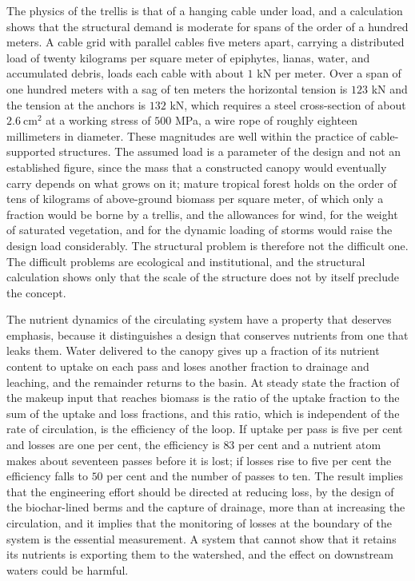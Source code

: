 The physics of the trellis is that of a hanging cable under load, and a calculation shows that the structural demand is moderate for spans of the order of a hundred meters. A cable grid with parallel cables five meters apart, carrying a distributed load of twenty kilograms per square meter of epiphytes, lianas, water, and accumulated debris, loads each cable with about $1$ kN per meter. Over a span of one hundred meters with a sag of ten meters the horizontal tension is $123$ kN and the tension at the anchors is $132$ kN, which requires a steel cross-section of about $2.6\ \mathrm{cm^2}$ at a working stress of $500$ MPa, a wire rope of roughly eighteen millimeters in diameter. These magnitudes are well within the practice of cable-supported structures. The assumed load is a parameter of the design and not an established figure, since the mass that a constructed canopy would eventually carry depends on what grows on it; mature tropical forest holds on the order of tens of kilograms of above-ground biomass per square meter, of which only a fraction would be borne by a trellis, and the allowances for wind, for the weight of saturated vegetation, and for the dynamic loading of storms would raise the design load considerably. The structural problem is therefore not the difficult one. The difficult problems are ecological and institutional, and the structural calculation shows only that the scale of the structure does not by itself preclude the concept.

The nutrient dynamics of the circulating system have a property that deserves emphasis, because it distinguishes a design that conserves nutrients from one that leaks them. Water delivered to the canopy gives up a fraction of its nutrient content to uptake on each pass and loses another fraction to drainage and leaching, and the remainder returns to the basin. At steady state the fraction of the makeup input that reaches biomass is the ratio of the uptake fraction to the sum of the uptake and loss fractions, and this ratio, which is independent of the rate of circulation, is the efficiency of the loop. If uptake per pass is five per cent and losses are one per cent, the efficiency is $83$ per cent and a nutrient atom makes about seventeen passes before it is lost; if losses rise to five per cent the efficiency falls to $50$ per cent and the number of passes to ten. The result implies that the engineering effort should be directed at reducing loss, by the design of the biochar-lined berms and the capture of drainage, more than at increasing the circulation, and it implies that the monitoring of losses at the boundary of the system is the essential measurement. A system that cannot show that it retains its nutrients is exporting them to the watershed, and the effect on downstream waters could be harmful.

